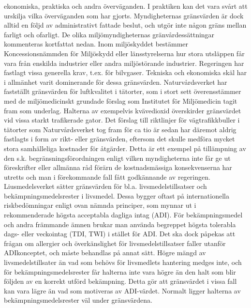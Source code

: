 ekonomiska, praktiska och andra överväganden. I praktiken kan det vara svårt att urskilja vilka överväganden som har gjorts. Myndigheternas gränsvärden är dock alltid en följd av administrativt fattade beslut, och utgör inte någon gräns mellan farligt och ofarligt. De olika miljömyndigheternas gränvårdessättningar kommenteras kortfattat nedan.
Inom miljöskyddet bestämmer Koncessionsnämmden för Miljöskydd eller länsstyrelserna hur stora utsläppen får vara från enskilda industrier eller andra miljöstörande industrier. Regeringen har fastlagt vissa generella krav, t.ex. för bilvgaser. Tekniska och ekonomiska skäl har i allmänhet varit dominerande för dessa gränsvärden.
Naturvårdsverket har fastställt gränsvärden för luftkvalitet i tätorter, som i stort sett överensstämmer med de miljömedicinskt grundade förslag som Institutet för Miljömedicin tagit fram som underlag. Halterna av exempelvis kvävedioxid överskirder gränsvärdet vid vissa starkt trafikerade gator. Det förslag till riktlinjer för vägtrafikkbuller i tätorter som Naturvårdsverket tog fram för ca tio är sedan har däremot aldrig fastlagts i form av rikt- eller gränsvärden, eftersom det skulle medföra mycket stora samhälleliga kostnader för åtgärder. Detta är ett exempel på tillämpning av den s.k. begränsningsförordningen enligt vilken myndigheterna inte får ge ut föreskrifter eller allmänna råd förärn de kostnadsmässiga konsekvenserna har utretts och man i förekommande fall fått godkännande av regeringen.
Liusmedelsverket sätter gränsvärden för bl.a. livsmedelstillsatser och bekämpningsmedelsrester i livsmedel. Dessa bygger oftast på internationella riskbedömningar enligt ovan nämnda principer, som mynnar ut i rekommenderade högsta acceptabla dagliga intag (ADI). För bekämpningsmedel och andra främmande ämnen brukar man använda begreppet högsta tolerabla dags- eller veckointag (TDI, TWI) i stället för ADI. Det ska dock påpekas att frågan om allergier och överkänslighet för livsmedelstillsatser faller utanför ADIkonceptet, och måste behandlas på annat sätt. Högre mängd av livsmedelstillsater än vad som behövs för livsmedlets hantering medges inte, och för bekämpningsmedelsrester får halterna inte vara högre än den halt som blir följden av en korrekt utförd bekämpning. Detta gör att gränsvärdet i vissa fall kan vara lägre än vad som motiveras av ADI-värdet. Normalt ligger halterna av bekämpningsmedelsrester väl under gränsvärdena.


